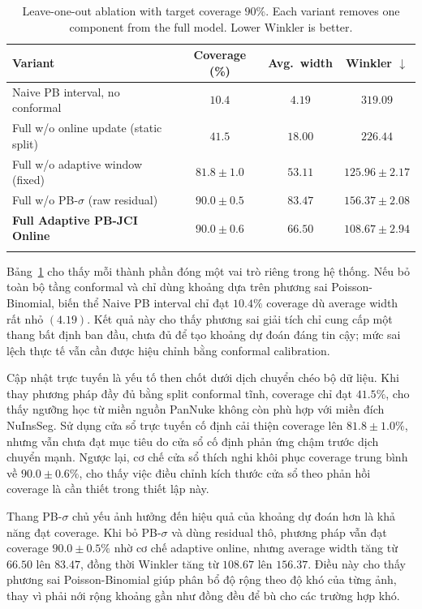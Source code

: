 \documentclass[pdflatex,sn-mathphys-num]{sn-jnl}
\begin{document}
\begin{table}[!htbp]
\caption{Leave-one-out ablation with target coverage $90\%$.
Each variant removes one component from the full model. Lower Winkler is better.}
\label{tab:ablation}
\centering
\small
\begin{tabular}{@{}lccc@{}}
\toprule
Variant & Coverage (\%) & Avg.\ width & Winkler $\downarrow$ \\
\midrule
Naive PB interval, no conformal       & $10.4$        & $4.19$  & $319.09$ \\
Full w/o online update (static split) & $41.5$        & $18.00$ & $226.44$ \\
Full w/o adaptive window (fixed)      & $81.8\pm1.0$  & $53.11$ & $125.96\pm2.17$ \\
Full w/o PB-$\sigma$ (raw residual)   & $90.0\pm0.5$  & $83.47$ & $156.37\pm2.08$ \\
\midrule
\textbf{Full Adaptive PB-JCI Online}  & $\mathbf{90.0\pm0.6}$ & $66.50$ & $\mathbf{108.67\pm2.94}$ \\
\botrule
\end{tabular}
\end{table}

Bảng~\ref{tab:ablation} cho thấy mỗi thành phần đóng một vai trò riêng trong hệ thống.
Nếu bỏ toàn bộ tầng conformal và chỉ dùng khoảng dựa trên phương sai
Poisson-Binomial, biến thể Naive PB interval chỉ đạt $10.4\%$ coverage dù average
width rất nhỏ $(4.19)$. Kết quả này cho thấy phương sai giải tích chỉ cung cấp một
thang bất định ban đầu, chưa đủ để tạo khoảng dự đoán đáng tin cậy; mức sai lệch thực
tế vẫn cần được hiệu chỉnh bằng conformal calibration.

Cập nhật trực tuyến là yếu tố then chốt dưới dịch chuyển chéo bộ dữ liệu. Khi thay
phương pháp đầy đủ bằng split conformal tĩnh, coverage chỉ đạt $41.5\%$, cho thấy
ngưỡng học từ miền nguồn PanNuke không còn phù hợp với miền đích NuInsSeg. Sử dụng cửa
sổ trực tuyến cố định cải thiện coverage lên $81.8\pm1.0\%$, nhưng vẫn chưa đạt mục
tiêu do cửa sổ cố định phản ứng chậm trước dịch chuyển mạnh. Ngược lại, cơ chế cửa sổ
thích nghi khôi phục coverage trung bình về $90.0\pm0.6\%$, cho thấy việc điều chỉnh
kích thước cửa sổ theo phản hồi coverage là cần thiết trong thiết lập này.

Thang PB-\(\sigma\) chủ yếu ảnh hưởng đến hiệu quả của khoảng dự đoán hơn là khả năng
đạt coverage. Khi bỏ PB-\(\sigma\) và dùng residual thô, phương pháp vẫn đạt coverage
$90.0\pm0.5\%$ nhờ cơ chế adaptive online, nhưng average width tăng từ $66.50$ lên
$83.47$, đồng thời Winkler tăng từ $108.67$ lên $156.37$. Điều này cho thấy
phương sai Poisson-Binomial giúp phân bổ độ rộng theo độ khó của từng ảnh, thay vì phải
nới rộng khoảng gần như đồng đều để bù cho các trường hợp khó.
\end{document}
